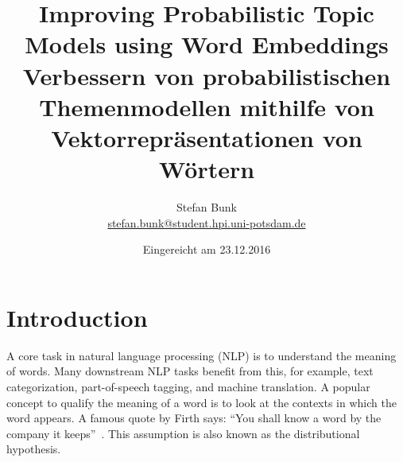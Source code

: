 \documentclass[
        a4paper,
        titlepage,
        twoside,
        parskip
        ]{scrbook}
\title{Improving Probabilistic Topic Models using Word Embeddings
\\ \bigskip
\large{Verbessern von probabilistischen Themenmodellen mithilfe von Vektorrepräsentationen von Wörtern}}
\author{Stefan Bunk\\{\small{\url{stefan.bunk@student.hpi.uni-potsdam.de}}}}
\date{Eingereicht am 23.12.2016}
\theoremstyle{break}
\begin{document}
\maketitle
\cleardoublepage


\setcounter{secnumdepth}{4}
\setcounter{tocdepth}{4}
\tableofcontents

\chapter{Introduction}

A core task in natural language processing (NLP) is to understand the meaning of words.
Many downstream NLP tasks benefit from this, for example, text categorization, part-of-speech tagging, and machine translation.
A popular concept to qualify the meaning of a word is to look at the contexts in which the word appears.
A famous quote by Firth says: ``You shall know a word by the company it keeps''~\cite{Firth1957}.
This assumption is also known as the distributional hypothesis.
\end{document}
